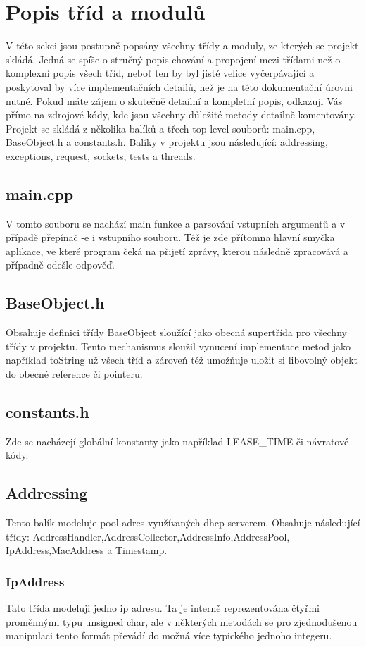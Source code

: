 \documentclass[12pt,a4paper]{report}
\begin{document}
\chapter{Popis tříd a modulů}
V této sekci jsou postupně popsány všechny třídy a moduly, ze kterých se projekt skládá.  Jedná se spíše o stručný popis chování a propojení mezi třídami než o komplexní popis všech tříd, neboť ten by byl jistě velice vyčerpávající a poskytoval by více implementačních detailů, než je na této dokumentační úrovni nutné. Pokud máte zájem o skutečně detailní a kompletní popis, odkazuji Vás přímo na zdrojové kódy, kde jsou všechny důležité metody detailně komentovány. 
Projekt se skládá z několika balíků a třech top-level  souborů: main.cpp, BaseObject.h a constants.h.
Balíky v projektu jsou následující: addressing, exceptions, request, sockets, tests a threads. 
\section*{main.cpp}
V tomto souboru se nachází main funkce a parsování vstupních argumentů a v případě přepínač -e i vstupního souboru. Též je zde přítomna hlavní smyčka aplikace, ve které program čeká na přijetí zprávy, kterou následně zpracovává a případně odešle odpověď.
\section*{BaseObject.h}
Obsahuje definici třídy BaseObject sloužící jako obecná supertřída pro všechny třídy v projektu. Tento mechanismus sloužil vynucení implementace metod jako například toString už všech tříd a zároveň též umožňuje uložit si libovolný objekt do obecné reference či pointeru.
\section*{constants.h}
Zde se nacházejí globální konstanty jako například LEASE\_TIME či návratové kódy.
\section*{Addressing}
Tento balík modeluje pool adres využívaných dhcp serverem. Obsahuje následující třídy: AddressHandler,AddressCollector,AddressInfo,AddressPool,\\IpAddress,MacAddress a Timestamp.
\subsection*{IpAddress}
Tato třída modeluji jedno ip adresu. Ta je interně reprezentována čtyřmi proměnnými typu unsigned char, ale v některých metodách se pro zjednodušenou manipulaci tento formát převádí do možná více typického jednoho integeru.
\end{document}

